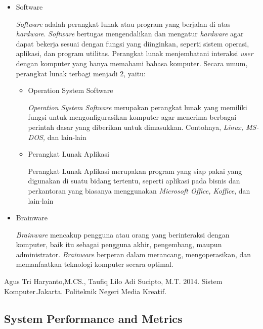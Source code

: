 \documentclass[12pt]{article}
\begin{document}
\begin{itemize}
        \item Software 
        \par
        \textit{Software} adalah perangkat lunak atau program yang berjalan di atas \textit{hardware}. \textit{Software} bertugas mengendalikan dan mengatur \textit{hardware} agar dapat bekerja sesuai dengan fungsi yang diinginkan, seperti sistem operasi, aplikasi, dan program utilitas. Perangkat lunak menjembatani interaksi\textit{ user} dengan komputer yang hanya memahami bahasa komputer. Secara umum, perangkat lunak terbagi menjadi 2, yaitu:
        \begin{itemize}
            \item Operation System Software
            \par
            \textit{Operation System Software} merupakan perangkat lunak yang memiliki fungsi untuk mengonfigurasikan komputer agar menerima berbagai perintah dasar yang diberikan untuk dimasukkan. Contohnya, \textit{Linux, MS-DOS,} dan lain-lain
            \item Perangkat Lunak Aplikasi
            \par
            Perangkat Lunak Aplikasi merupakan program yang siap pakai yang digunakan di suatu bidang tertentu, seperti aplikasi pada bisnis dan perkantoran yang biasanya menggunakan\textit{ Microsoft Office, Koffice}, dan lain-lain
        \end{itemize}
        \item Brainware 
        \par
       \textit{ Brainware } mencakup pengguna atau orang yang berinteraksi dengan komputer, baik itu sebagai pengguna akhir, pengembang, maupun administrator. \textit{Brainware }berperan dalam merancang, mengoperasikan, dan memanfaatkan teknologi komputer secara optimal.
    \end{itemize}
    \begin{bibliography}
    Agus Tri Haryanto,M.CS., Taufiq Lilo Adi Sucipto, M.T. 2014. Sistem Komputer.Jakarta. Politeknik Negeri Media Kreatif.
\end{bibliography}

   

\subsection{System Performance and Metrics}
\end{document}
